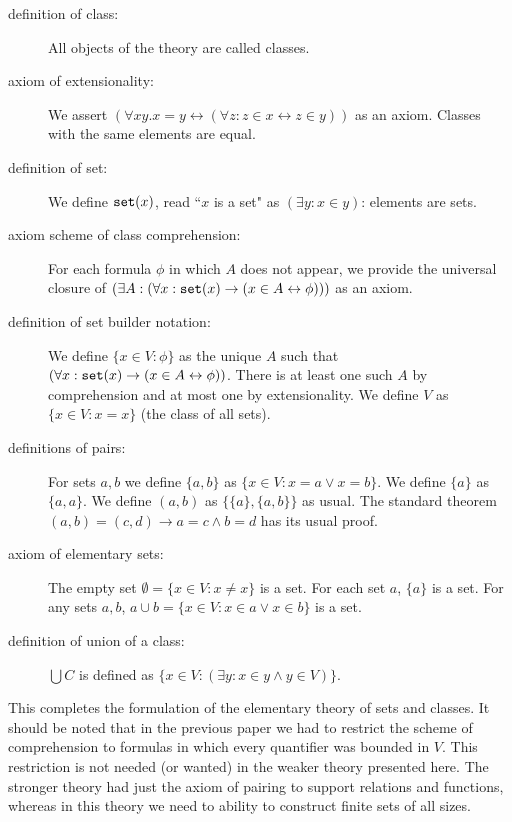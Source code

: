 \documentclass{article}
\begin{document}
\begin{description}

\item[definition of class:]  All objects of the theory are called classes.

\item[axiom of extensionality:]  We assert $(\forall xy.x=y \leftrightarrow (\forall z:z \in x \leftrightarrow z \in y))$ as an axiom.  Classes with the same elements are equal.

\item[definition of set:]  We define ${\tt set}(x)$, read ``$x$ is a set" as $(\exists y:x \in y)$:  elements are sets.

\item[axiom scheme of class comprehension:]  For each formula $\phi$ in which $A$ does not appear, we provide the universal closure of $(\exists A:(\forall x:{\tt set}(x) \rightarrow (x \in A \leftrightarrow \phi)))$ as an axiom.

\item[definition of set builder notation:]  We define $\{x \in V:\phi\}$ as the unique $A$ such that $(\forall x:{\tt set}(x) \rightarrow (x \in A \leftrightarrow \phi))$.  
There is at least one such $A$ by comprehension and at most one by extensionality.  We define $V$ as $\{x \in V:x=x\}$ (the class of all sets).

\item[definitions of pairs:]  For sets $a,b$ we define $\{a,b\}$ as $\{x \in V:x=a \vee x=b\}$.  We define $\{a\}$ as $\{a,a\}$.  We define $(a,b)$ as
$\{\{a\},\{a,b\}\}$ as usual.  The standard theorem $(a,b) = (c,d) \rightarrow a=c \wedge b=d$ has its usual proof.

\item[axiom of elementary sets:]  The empty set $\emptyset = \{x \in V:x \neq x\}$ is a set.  For each set $a$, $\{a\}$ is a set.  For any sets $a,b$, $a \cup b = \{x \in V:x \in a \vee x \in b\}$ is a set.

\item[definition of union of a class:]  $\bigcup C$ is defined as $\{x \in V:(\exists y:x \in y \wedge y \in V)\}$.

\end{description}

This completes the formulation of the elementary theory of sets and classes.  It should be noted that in the previous paper we had to restrict the scheme of comprehension to formulas in which every quantifier was bounded in $V$.  This restriction is not needed (or wanted) in the weaker theory presented here.  The stronger theory had just the axiom of pairing to support relations and functions, whereas in this theory we need to ability to construct finite sets of all sizes.
\end{document}
